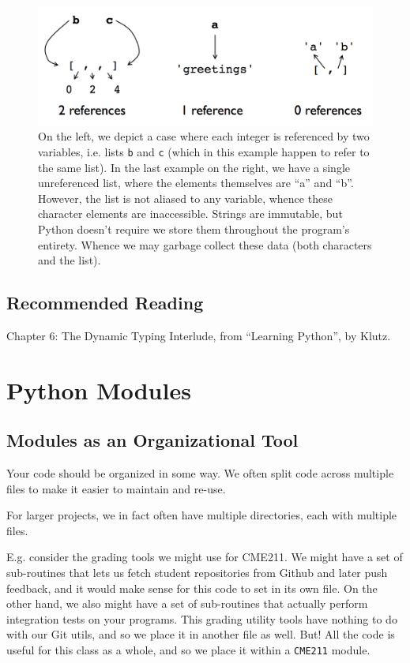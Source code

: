 \documentclass[12pt,letterpaper,twoside]{article}
\begin{document}
\begin{figure}[h]
\centering
\includegraphics[scale=0.35]{fig/gc-2.png}
\caption{\footnotesize On the left, we depict a case where each integer is referenced by two variables, i.e. 
lists \texttt{b} and \texttt{c} (which in this example happen to refer to the same list). In the last example on the right, we have a single 
unreferenced list, where the elements themselves are ``a'' and ``b''. However, the list is not aliased to any variable, whence these 
character elements are inaccessible. Strings are immutable, but Python doesn't require we store them throughout the program's entirety.
Whence we may garbage collect these data (both characters and the list).}
\end{figure}

\subsection{Recommended Reading}
Chapter 6: The Dynamic Typing Interlude, from ``Learning Python'', by Klutz.


\section{Python Modules}

\subsection{Modules as an Organizational Tool} Your code should be organized in some way.
We often split code across multiple files to make it easier to maintain and re-use.

For larger projects, we in fact often have multiple directories, each with multiple files.

E.g. consider the grading tools we might use for CME211. We might have a set of sub-routines that lets
us fetch student repositories from Github and later push feedback, and it would make sense for this code
to set in its own file. On the other hand, we also might have a set of sub-routines that actually
perform integration tests on your programs. This grading utility tools have nothing to do with our Git utils, and so we place it
in another file as well. But! All the code is useful for this class as a whole, and so we place it within a \texttt{CME211} module.
\end{document}
